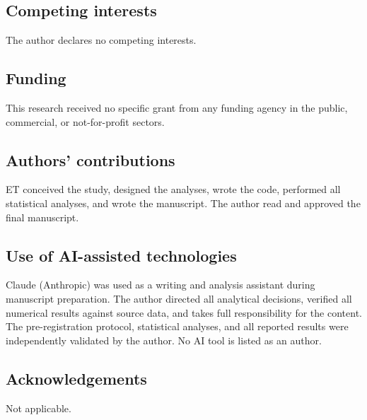 \documentclass[11pt]{article}
\begin{document}
\subsection*{Competing interests}
The author declares no competing interests.

\subsection*{Funding}
This research received no specific grant from any funding agency in the
public, commercial, or not-for-profit sectors.

\subsection*{Authors' contributions}
ET conceived the study, designed the analyses, wrote the code, performed
all statistical analyses, and wrote the manuscript.  The author read and
approved the final manuscript.

\subsection*{Use of AI-assisted technologies}
Claude (Anthropic) was used as a writing and analysis assistant during
manuscript preparation.  The author directed all analytical decisions,
verified all numerical results against source data, and takes full
responsibility for the content.  The pre-registration protocol,
statistical analyses, and all reported results were independently
validated by the author.  No AI tool is listed as an author.

\subsection*{Acknowledgements}
Not applicable.



\end{document}

